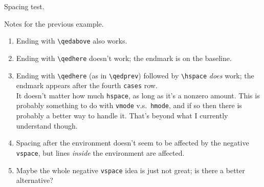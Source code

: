 \documentclass[leqno]{article}
\begin{document}
Spacing test.
\emph{\color{gray}\kant[3][1-3]}

Notes for the previous example.
\begin{enumerate}
\item Ending with \verb|\qedabove| also works.
\item Ending with \verb|\qedhere| doesn't work; the endmark is on the baseline.
\item Ending with \verb|\qedhere| (as in \verb|\qedprev|) followed by \verb|\hspace| \emph{does} work; the endmark appears after the fourth \texttt{cases} row.\\
  It doesn't matter how much \texttt{hspace}, as long as it's a nonzero amount.
  This is probably something to do with \texttt{vmode} v.s.~\texttt{hmode}, and if so then there is probably a better way to handle it.
  That's beyond what I currently understand though.
\item Spacing after the environment doesn't seem to be affected by the negative \texttt{vspace}, but lines \emph{inside} the environment are affected.
\item Maybe the whole negative \texttt{vspace} idea is just not great; is there a better alternative?
\end{enumerate}
\end{document}
